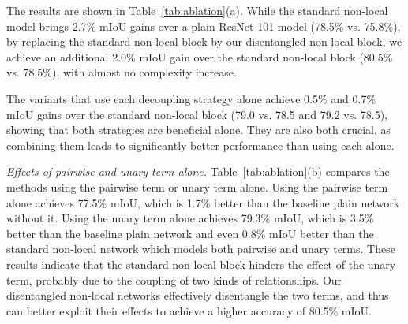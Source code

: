 \documentclass[runningheads]{llncs}
\begin{document}
The results are shown in Table~\ref{tab:ablation}(a). While the standard
non-local model brings 2.7\% mIoU gains over a plain ResNet-101 model (78.5\% vs. 75.8\%), by replacing the standard non-local block by our disentangled non-local block, we achieve an additional 2.0\% mIoU gain over the standard non-local block (80.5\% vs. 78.5\%), with almost no complexity increase.

The variants that use each decoupling strategy alone achieve 0.5\% and 0.7\% mIoU gains over the standard non-local block (79.0 vs. 78.5 and 79.2 vs. 78.5), showing that both strategies are beneficial alone. They are also both crucial, as combining them leads to significantly better performance than using each alone.

\noindent \emph{Effects of pairwise and unary term alone.}
Table~\ref{tab:ablation}(b) compares the methods using the pairwise term or unary term alone. Using the pairwise term alone achieves 77.5\% mIoU, which is 1.7\% better than the baseline plain network without it. Using the unary term alone achieves 79.3\% mIoU, which is 3.5\% better than the baseline plain network and even 0.8\% mIoU better than the standard non-local network which models both pairwise and unary terms. These results indicate that the standard non-local block hinders the effect of the unary term, probably due to the coupling of two kinds of relationships. Our disentangled non-local networks effectively disentangle the two terms, and thus can better exploit their effects to achieve a higher accuracy of 80.5\% mIoU.
\end{document}
